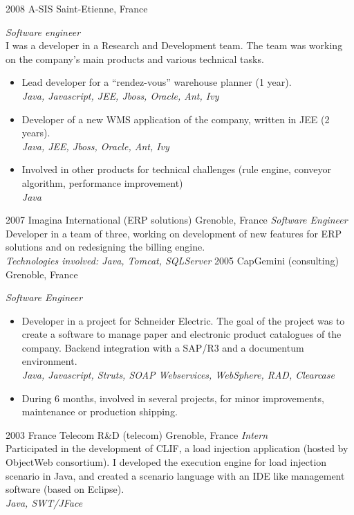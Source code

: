 \documentclass[]{k-cv} %
\begin{document}
\clearpage


\begin{entrylist}
\entry
{2008 }
{A-SIS}
{Saint-Etienne, France}
{\emph{Software engineer} \\
 I was a developer in a Research and Development team.
The team was working on the company’s main products and various technical tasks.
\begin{itemize}
\item
Lead developer for a ``rendez-vous'' warehouse planner (1 year). \\
\emph{Java, Javascript, JEE, Jboss, Oracle, Ant, Ivy}
\item
Developer of a new WMS application of the company, written in JEE (2 years). \\
\emph{Java, JEE, Jboss, Oracle, Ant, Ivy}
\item
Involved in other products for technical challenges (rule engine, conveyor algorithm, performance improvement) \\
\emph{Java}
\end{itemize}}
\entry
{2007 }
{Imagina International (ERP solutions)}
{Grenoble, France}
{\emph{Software Engineer} \\
Developer in a team of three, working on development of
new features for ERP solutions and on redesigning the billing engine. \\
\emph{
Technologies involved:
Java, Tomcat, SQLServer
}}
\entry
{2005 }
{CapGemini (consulting)}
{Grenoble, France}
{\emph{Software Engineer}
\begin{itemize}
\item
Developer in a project for Schneider Electric.
The goal of the project was to create a software to manage paper and electronic product
catalogues of the company.
Backend integration with a SAP/R3 and a documentum environment. \\
\emph{Java, Javascript, Struts, SOAP Webservices, WebSphere, RAD, Clearcase}
\item
During 6 months, involved in several projects, for minor improvements, maintenance or production shipping.
\end{itemize}}
\entry
{2003 }
{France Telecom R\&D (telecom)}
{Grenoble, France}
{\emph{Intern} \\
Participated in the development of CLIF,
a load injection application (hosted by ObjectWeb consortium).
I developed the execution engine for load injection scenario in Java,
and created a scenario language with an IDE like management software (based on Eclipse). \\
\emph{Java, SWT/JFace}}
\end{entrylist}
\end{document}
